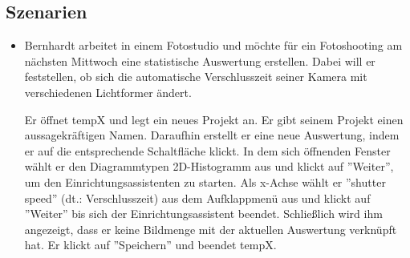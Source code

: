 \subsection{Szenarien}

\begin{itemize}
	\item Bernhardt arbeitet in einem Fotostudio und möchte für ein Fotoshooting am nächsten Mittwoch eine statistische Auswertung erstellen. Dabei will er feststellen, ob sich die automatische Verschlusszeit seiner Kamera mit verschiedenen \gls{Lichtformer} ändert.
	
Er öffnet \gls{tempX} und legt ein neues Projekt an. Er gibt seinem Projekt einen aussagekräftigen Namen.  Daraufhin erstellt er eine neue Auswertung, indem er auf die entsprechende Schaltfläche klickt. In dem sich öffnenden Fenster wählt er den Diagrammtypen 2D-Histogramm aus und klickt auf ''Weiter'', um den Einrichtungsassistenten zu starten. Als x-Achse wählt er ''shutter speed'' (dt.: Verschlusszeit) aus dem Aufklappmenü aus und klickt auf ''Weiter'' bis sich der Einrichtungsassistent beendet. Schließlich wird ihm angezeigt, dass er keine Bildmenge mit der aktuellen Auswertung verknüpft hat. Er klickt auf ''Speichern'' und beendet \gls{tempX}. 

\end{itemize}